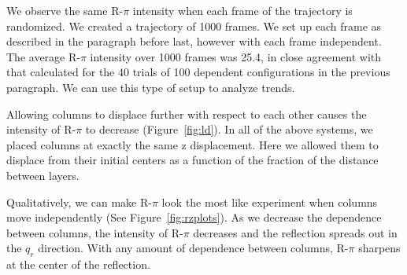 \documentclass{article}
\begin{document}
  We observe the same R-$\pi$ intensity when each frame of the trajectory is
  randomized. We created a trajectory of 1000 frames. We set up each frame as
  described in the paragraph before last, however with each frame independent. The
  average R-$\pi$ intensity over 1000 frames was 25.4, in close agreement with
  that calculated for the 40 trials of 100 dependent configurations in the
  previous paragraph. We can use this type of setup to analyze trends.  

  Allowing columns to displace further with respect to each other causes the
  intensity of R-$\pi$ to decrease (Figure~\ref{fig:ld}). In all of the above
  systems, we placed columns at exactly the same z displacement. Here we allowed
  them to displace from their initial centers as a function of the fraction of
  the distance between layers.

  Qualitatively, we can make R-$\pi$ look the most like experiment when columns
  move independently (See Figure~\ref{fig:rzplots}). As we decrease the
  dependence between columns, the intensity of R-$\pi$ decreases and the
  reflection spreads out in the $q_r$ direction. With any amount of dependence
  between columns, R-$\pi$ sharpens at the center of the reflection. 
\end{document}
